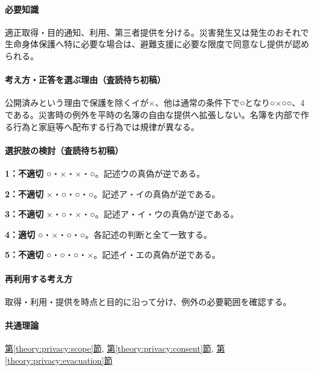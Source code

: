 \paragraph{必要知識} 適正取得・目的通知、利用、第三者提供を分ける。災害発生又は発生のおそれで生命身体保護へ特に必要な場合は、避難支援に必要な限度で同意なし提供が認められる。

\paragraph{考え方・正答を選ぶ理由（査読待ち初稿）} 公開済みという理由で保護を除くイが×、他は通常の条件下で○となり○×○○、4である。災害時の例外を平時の名簿の自由な提供へ拡張しない。名簿を内部で作る行為と家庭等へ配布する行為では規律が異なる。

\paragraph{選択肢の検討（査読待ち初稿）}\mbox{}\par

\noindent\textbf{1：不適切} ○・×・×・○。記述ウの真偽が逆である。\par

\noindent\textbf{2：不適切} ×・○・○・○。記述ア・イの真偽が逆である。\par

\noindent\textbf{3：不適切} ×・○・×・○。記述ア・イ・ウの真偽が逆である。\par

\noindent\textbf{4：適切} ○・×・○・○。各記述の判断と全て一致する。\par

\noindent\textbf{5：不適切} ○・○・○・×。記述イ・エの真偽が逆である。\par

\paragraph{再利用する考え方} 取得・利用・提供を時点と目的に沿って分け、例外の必要範囲を確認する。

\paragraph{共通理論} \hyperref[theory:privacy:scope]{第\ref*{theory:privacy:scope}節}, \hyperref[theory:privacy:consent]{第\ref*{theory:privacy:consent}節}, \hyperref[theory:privacy:evacuation]{第\ref*{theory:privacy:evacuation}節}

